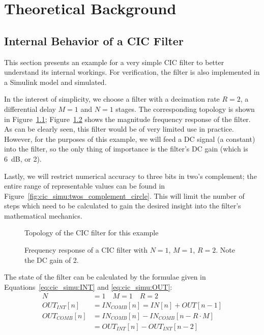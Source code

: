 \chapter{Theoretical Background}
\label{ch:app:theoretical_background}

\section{Internal Behavior of a CIC Filter}
\label{sec:app:cic_simu}

This  section presents  an example  for  a very  simple CIC  filter to  better
understand  its  internal  workings. For  verification,  the  filter  is  also
implemented in a Simulink model and simulated.

In the interest of simplicity, we choose  a filter with a decimation rate $R =
2$, a differential delay $M=1$ and $N=1$ stages. The corresponding topology is
shown in Figure~\ref{fig:cic_simu:topo}; Figure~\ref{fig:cic_simu:freqz} shows
the magnitude frequency  response of the filter. As can be  clearly seen, this
filter would be of very limited  use in practice. However, for the purposes of
this example, we  will feed a DC  signal (a constant) into the  filter, so the
only thing  of importance is  the filter's DC  gain (which is  \SI{6}{\dB}, or
\num{2}).

Lastly,  we  will   restrict  numerical  accuracy  to  three   bits  in  two's
complement;  the  entire  range  of  representable  values  can  be  found  in
Figure~\ref{fig:cic_simu:twos_complement_circle}. This  will limit  the number
of steps  which need  to be calculated  to gain the  desired insight  into the
filter's mathematical mechanics.

\begin{figure}
    \centering
    
    \caption[Topology of Example Filter]{Topology of the CIC filter for this example}
    \label{fig:cic_simu:topo}
\end{figure}

\begin{figure}
    \centering
    
    \caption[Frequency Respose of Example CIC Filter]{%
        Frequency response of a CIC  filter with $N=1$, $M=1$, $R=2$. Note the
        DC gain of \num{2}.%
    }
    \label{fig:cic_simu:freqz}
\end{figure}

The  state  of  the  filter  can  be  calculated  by  the  formulae  given  in
Equations~\ref{eq:cic_simu:INT} and \ref{eq:cic_simu:OUT}:
\begin{align}
    N             & = 1 \quad M = 1 \quad R=2\nonumber\\     
    OUT_{INT}[n]  & = IN_{COMB}[n] = IN[n]        + OUT[n-1] 
    \label{eq:cic_simu:INT} \\
    OUT_{COMB}[n] & = IN_{COMB}[n] - IN_{COMB}[n-R\cdot M] 
    \nonumber\\
                  & = OUT_{INT}[n] - OUT_{INT}[n-2] 
    \label{eq:cic_simu:OUT}
\end{align}

